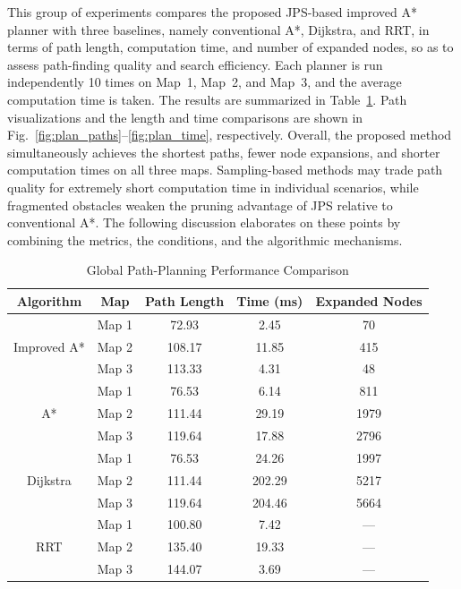 This group of experiments compares the proposed JPS-based improved A* planner with three baselines, namely conventional A*, Dijkstra, and RRT, in terms of path length, computation time, and number of expanded nodes, so as to assess path-finding quality and search efficiency. Each planner is run independently 10 times on Map~1, Map~2, and Map~3, and the average computation time is taken. The results are summarized in Table~\textcolor{blue}{\ref{tab:plan}}. Path visualizations and the length and time comparisons are shown in Fig.~\textcolor{blue}{\ref{fig:plan_paths}}--\textcolor{blue}{\ref{fig:plan_time}}, respectively. Overall, the proposed method simultaneously achieves the shortest paths, fewer node expansions, and shorter computation times on all three maps. Sampling-based methods may trade path quality for extremely short computation time in individual scenarios, while fragmented obstacles weaken the pruning advantage of JPS relative to conventional A*. The following discussion elaborates on these points by combining the metrics, the conditions, and the algorithmic mechanisms.

\begin{table}[!ht]
\caption{Global Path-Planning Performance Comparison}
\label{tab:plan}
\centering
\footnotesize
\setlength{\tabcolsep}{4pt}
\begin{tabular}{ccccc}
\toprule
Algorithm & Map & Path Length & Time (ms) & Expanded Nodes \\
\midrule
\multirow{3}{*}{Improved A*}
& Map 1 & 72.93 & 2.45 & 70 \\
& Map 2 & 108.17 & 11.85 & 415 \\
& Map 3 & 113.33 & 4.31 & 48 \\
\midrule
\multirow{3}{*}{A*}
& Map 1 & 76.53 & 6.14 & 811 \\
& Map 2 & 111.44 & 29.19 & 1979 \\
& Map 3 & 119.64 & 17.88 & 2796 \\
\midrule
\multirow{3}{*}{Dijkstra}
& Map 1 & 76.53 & 24.26 & 1997 \\
& Map 2 & 111.44 & 202.29 & 5217 \\
& Map 3 & 119.64 & 204.46 & 5664 \\
\midrule
\multirow{3}{*}{RRT}
& Map 1 & 100.80 & 7.42 & --- \\
& Map 2 & 135.40 & 19.33 & --- \\
& Map 3 & 144.07 & 3.69 & --- \\
\bottomrule
\end{tabular}
\end{table}

